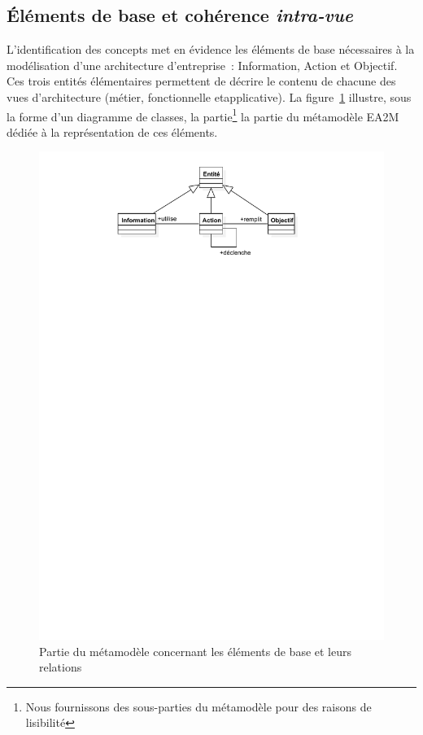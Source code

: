     \subsection{Éléments de base et cohérence \emph{intra-vue}}

    L'identification des concepts met en évidence les éléments de base nécessaires à la modélisation d'une
    architecture d'entreprise~: Information, Action et Objectif. Ces trois entités élémentaires permettent de décrire
    le contenu de chacune des vues d’architecture (métier, fonctionnelle etapplicative).
    La figure~\ref{fig:core_concepts} illustre, sous la forme d'un diagramme de 
    classes, la partie\footnote{Nous fournissons des sous-parties du métamodèle pour des raisons de
    lisibilité} la partie du métamodèle EA2M dédiée à la représentation de ces éléments.

    \begin{figure}[!ht]
    \begin{center}
    \includegraphics[trim= 0cm 23cm 0cm 0cm, width=1\textwidth]{figures/4_demarche/core_concepts.pdf}
    \end{center}
    \caption{Partie du métamodèle concernant les éléments de base et leurs relations} 
    \label{fig:core_concepts}
    \end{figure}

